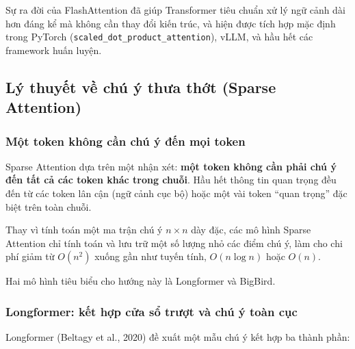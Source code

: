 Sự ra đời của FlashAttention đã giúp Transformer tiêu chuẩn xử lý ngữ cảnh dài hơn đáng kể mà không cần thay đổi kiến trúc, và hiện được tích hợp mặc định trong PyTorch (\texttt{scaled\_\allowbreak dot\_\allowbreak product\_\allowbreak attention}), vLLM, và hầu hết các framework huấn luyện.
\subsection{Lý thuyết về chú ý thưa thớt (Sparse Attention)}
\label{ssec:sparse_attention_theory}

\subsubsection{Một token không cần chú ý đến mọi token}
Sparse Attention dựa trên một nhận xét: \textbf{một token không cần phải chú ý đến tất cả các token khác trong chuỗi}. Hầu hết thông tin quan trọng đều đến từ các token lân cận (ngữ cảnh cục bộ) hoặc một vài token “quan trọng” đặc biệt trên toàn chuỗi.

Thay vì tính toán một ma trận chú ý $n \times n$ dày đặc, các mô hình Sparse Attention chỉ tính toán và lưu trữ một số lượng nhỏ các điểm chú ý, làm cho chi phí giảm từ $O(n^2)$ xuống gần như tuyến tính, $O(n \log n)$ hoặc $O(n)$.

\begin{center}
    \label{fig:sparse_attention_patterns}
\end{center}

Hai mô hình tiêu biểu cho hướng này là Longformer và BigBird.

\subsubsection{Longformer: kết hợp cửa sổ trượt và chú ý toàn cục}
Longformer (Beltagy et al., 2020) \cite{beltagy2020longformer} đề xuất một mẫu chú ý kết hợp ba thành phần:

